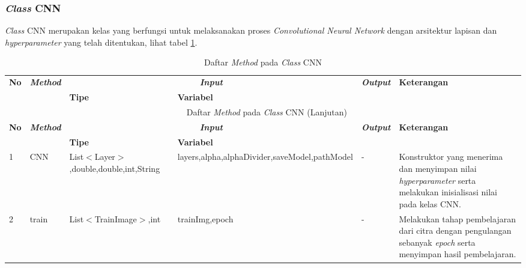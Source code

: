 \subsubsection{\textit{Class} CNN}
\noindent \textit{Class} CNN merupakan kelas yang berfungsi untuk melaksanakan proses \textit{Convolutional Neural Network} dengan arsitektur lapisan dan \textit{hyperparameter} yang telah ditentukan, lihat tabel \ref{tbl:classCNN}.
\begingroup
\setlength{\LTleft}{-20cm plus -1fill}
\setlength{\LTright}{\LTleft}
\begin{small}
\begin{longtable}{|p{0.4cm}|p{2cm}|p{1.8cm}|p{1.8cm}|p{1.7cm}|p{3.55cm}|}
	\caption{Daftar \textit{Method} pada \textit{Class} CNN \label{tbl:classCNN}}\\
	\hline
	\multirow{2}{*}{\textbf{No}} & \multirow{2}{*}{\textit{\textbf{Method}}} & \multicolumn{2}{c|}{\textit{\textbf{Input}}} & \multirow{2}{*}{\textit{\textbf{Output}}} & 
	\multirow{2}{*}{\textbf{Keterangan}}\\
	\cline{3-4}
	& & \textbf{Tipe} & \textbf{Variabel} & & \\
	\endfirsthead
	\multicolumn{6}{c}{\textbf{\tablename~\thetable} Daftar \textit{Method} pada \textit{Class} CNN (Lanjutan)} \\ \hline
	\multirow{2}{*}{\textbf{No}} & \multirow{2}{*}{\textit{\textbf{Method}}} & \multicolumn{2}{c|}{\textit{\textbf{Input}}} & \multirow{2}{*}{\textit{\textbf{Output}}} & 
	\multirow{2}{*}{\textbf{Keterangan}}\\
	\cline{3-4}
	& & \textbf{Tipe} & \textbf{Variabel} & & \\
	\endhead
	\hline
	1 & CNN & List$<$\newline Layer$>$,\newline double,\newline double,\newline int,\newline String & layers,\newline alpha,\newline alphaDivider,\newline saveModel,\newline pathModel & - & Konstruktor yang menerima dan menyimpan nilai \textit{hyperparameter} serta melakukan inisialisasi nilai pada kelas CNN.\\
	\hline
	2 & train & List$<$\newline TrainImage\newline$>$,\newline int & trainImg,\newline epoch & - & Melakukan tahap pembelajaran dari citra dengan pengulangan sebanyak \textit{epoch} serta menyimpan hasil pembelajaran.\\

\end{longtable}
\end{small}
